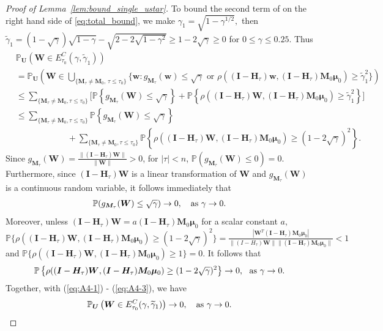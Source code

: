 \documentclass[12pt]{article}
\theoremstyle{shortspace}
\def\*#1{\bm{#1}}
\def\P{\mathbb P}
\begin{document}
\begin{proof}[Proof of Lemma~\ref{lem:bound_single_ustar}]
To bound the second term of on the right hand side of \eqref{eq:total_bound}, we  make $\gamma_1= \sqrt{1- \gamma^{1/2}},$ then $\widetilde\gamma_1=(1-\sqrt{\gamma})\sqrt{1- \gamma} - \sqrt{2-2\sqrt{1-\gamma^2}} \geq 1 - 2\sqrt{\gamma} \geq 0$ for $0 \leq \gamma \leq 0.25.$ Thus 
\begin{align} \label{eq:A4-1} & \P_{\*U}\left(\*W \in E^C_{\tau_0}( \gamma, \widetilde \gamma_1)\right) \nonumber
 \\
 & = \P_{\*U}\left( \*W \in \bigcup_{\{\*M_\tau \neq \*M_0, \, \tau \leq \tau_0\}}\{\*w: g_{\*M_\tau}(\*w) \leq  \sqrt{\gamma} \mbox{ or }  \rho((\*I - \*H_\tau)\*w, (\*I - \*H_\tau)\*M_0\*\mu_0) \geq  \widetilde \gamma_1^2\}\right) \nonumber
 \\
  & \leq    \sum_{\{\*M_\tau \neq \*M_0, \tau \leq \tau_0\}}\bigg[\P\left\{g_{\*M_\tau}(\*W) \leq \sqrt{\gamma}\right\} +  \P\left\{\rho((\*I - \*H_\tau)\*W, (\*I - \*H_\tau)\*M_0\*\mu_0)\geq  \widetilde \gamma_1^2\right\}\bigg] \nonumber \\
   & \leq    \sum_{\{\*M_\tau \neq \*M_0, \tau \leq \tau_0\}}\P\left\{g_{\*M_\tau}(\*W) \leq \sqrt{\gamma}\right\} \nonumber \\ & \qquad\qquad\qquad + \sum_{\{\*M_\tau \neq \*M_0, \tau \leq \tau_0\}} \P\left\{\rho((\*I - \*H_\tau)\*W, (\*I - \*H_\tau)\*M_0\*\mu_0)\geq  (1 - 2\sqrt{\gamma})^2\right\}. 
\end{align}
Since $g_{\*M_\tau}(\*W)  = \frac{\|(\*I - \*H_\tau)\*W\|}{\|\*W\|} >0$, for $|\tau| < n$,  $\P(g_{\*M_\tau}(\*W)  \leq 0) = 0$.  Furthermore, since $(\*I - \*H_\tau)\*W$ is a linear transformation of $\*W$ and $g_{\*M_\tau}(\*W)$ is a continuous random variable, it follows immediately that 
\begin{align} \label{eq:A4-2}
\P(g_{\*M_\tau}(\*W)  \leq \sqrt{\gamma}) \rightarrow 0, 
\hbox{ \,\, as $\gamma \rightarrow 0.$}  
\end{align}
Moreover, unless $(\*I-\*H_\tau)\*W = a (\*I - \*H_\tau)\*M_0\*\mu_0$ for a scalar constant $a,$
$\P\big\{\rho((\*I - \*H_\tau)\*W, (\*I - \*H_\tau)\*M_0\*\mu_0)\geq  (1 - 2\sqrt{\gamma})^2\big\} = \frac{|\*W^T(\*I - \*H_\tau) \*M_0\*\mu_0|}{\|(I - H_\tau)\*W\|\|(\*I - \*H_\tau) \*M_0\*\mu_0\|} < 1$
and $\P\big\{\rho((\*I - \*H_\tau)\*W, (\*I - \*H_\tau)\*M_0\*\mu_0)\geq  1\big\} = 0$. 
It follows that  
\begin{align} \label{eq:A4-3}
\P\left\{\rho((\*I - \*H_\tau)\*W, (\*I - \*H_\tau)\*M_0\*\mu_0)\geq  (1 - 2\sqrt{\gamma})^2\right\} \rightarrow 0, \hbox{\,\, as $\gamma \rightarrow 0.$}   
\end{align}
Together, with (\ref{eq:A4-1}) - (\ref{eq:A4-3}), we have $$\P_{\*U}\left(\*W \in E^C_{\tau_0}( \gamma, \widetilde \gamma_1)\right) \rightarrow 0, \quad \hbox{as $\gamma \rightarrow 0.$} $$


\end{proof}
\end{document}
